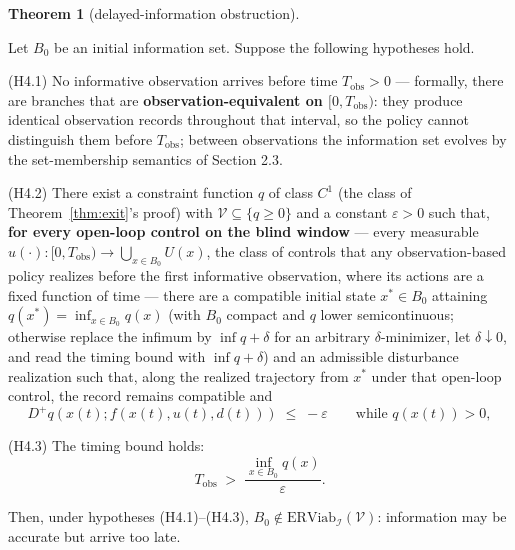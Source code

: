 \documentclass[11pt]{article}
\theoremstyle{definition}
\newtheorem{theorem}{Theorem}
\begin{document}
\begin{theorem}[delayed-information obstruction]\label{thm:delayed}

Let \(B_0\) be an initial information set. Suppose the following
hypotheses hold.

(H4.1) No informative observation arrives before time
\(T_{\mathrm{obs}} > 0\) --- formally, there are branches that are
\textbf{observation-equivalent on \([0, T_{\mathrm{obs}})\)}: they
produce identical observation records throughout that interval, so the
policy cannot distinguish them before \(T_{\mathrm{obs}}\); between
observations the information set evolves by the set-membership semantics
of Section 2.3.

(H4.2) There exist a constraint function \(q\) of class \(C^1\) (the
class of Theorem~\ref{thm:exit}'s proof) with \(\mathcal{V} \subseteq \{ q \ge 0 \}\)
and a constant \(\varepsilon > 0\) such that, \textbf{for every
open-loop control on the blind window} --- every measurable
\(u(\cdot) : [0, T_{\mathrm{obs}}) \to \bigcup_{x \in B_0} U(x)\), the
class of controls that any observation-based policy realizes before the
first informative observation, where its actions are a fixed function of
time --- there are a compatible initial state \(x^* \in B_0\) attaining
\(q(x^*) = \inf_{x \in B_0} q(x)\) (with \(B_0\) compact and \(q\) lower
semicontinuous; otherwise replace the infimum by \(\inf q + \delta\) for
an arbitrary \(\delta\)-minimizer, let \(\delta \downarrow 0\), and read
the timing bound with \(\inf q + \delta\)) and an admissible disturbance
realization such that, along the realized trajectory from \(x^*\) under
that open-loop control, the record remains compatible and
\[D^+ q(x(t); f(x(t), u(t), d(t))) \;\le\; -\varepsilon \qquad \text{while } q(x(t)) > 0, \tag{3}\]

(H4.3) The timing bound holds:
\[T_{\mathrm{obs}} \;>\; \frac{\inf_{x \in B_0} q(x)}{\varepsilon}. \tag{4}\]

Then, under hypotheses (H4.1)--(H4.3),
\(B_0 \notin \mathrm{ERViab}_{\mathcal{I}}(\mathcal{V})\): information
may be accurate but arrive too late.

\end{theorem}
\end{document}
